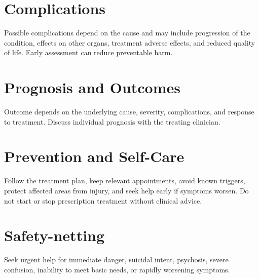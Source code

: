 \section*{Complications}
Possible complications depend on the cause and may include progression of the condition, effects on other organs, treatment adverse effects, and reduced quality of life. Early assessment can reduce preventable harm.

\section*{Prognosis and Outcomes}
Outcome depends on the underlying cause, severity, complications, and response to treatment. Discuss individual prognosis with the treating clinician.

\section*{Prevention and Self-Care}
Follow the treatment plan, keep relevant appointments, avoid known triggers, protect affected areas from injury, and seek help early if symptoms worsen. Do not start or stop prescription treatment without clinical advice.
\section*{Safety-netting}
Seek urgent help for immediate danger, suicidal intent, psychosis, severe confusion, inability to meet basic needs, or rapidly worsening symptoms.
